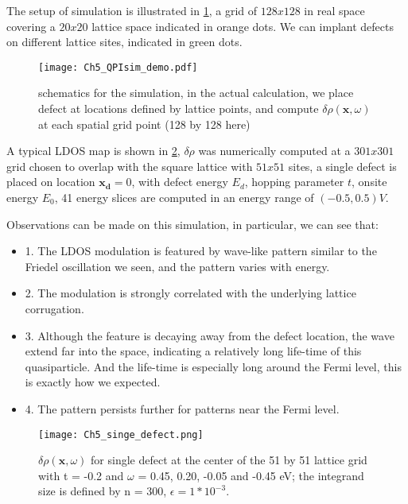 The setup of simulation is illustrated in \ref{fig:ch5_qpisim_demo}, a grid of $128x128$ in real space covering a $20x20$ lattice space indicated in orange dots. We can implant defects on different lattice sites, indicated in green dots. 

\begin{figure}
	\centering
	\texttt{[image: Ch5\_QPIsim\_demo.pdf]}
	\caption{schematics for the simulation, in the actual calculation, we place defect at locations defined by lattice points, and compute $\delta\rho(\textbf{x},\omega)$ at each spatial grid point (128 by 128 here)}
	\label{fig:ch5_qpisim_demo}
\end{figure}

A typical \ac{LDOS} map is shown in \ref{fig:ch5_single_scattering}, $\delta\rho$ was numerically computed at a $301x301$ grid chosen to overlap with the square lattice with $51x51$ sites, a single defect is placed on location $\mathbf{x_d}=0$, with defect energy $E_d$, hopping parameter $t$, onsite energy $E_0$, 41 energy slices are computed in an energy range of $(-0.5, 0.5)V$.  

Observations can be made on this simulation, in particular, we can see that:
\begin{itemize}
	\item 1. The \ac{LDOS} modulation is featured by wave-like pattern similar to the Friedel oscillation we seen, and the pattern varies with energy.
	\item 2. The modulation is strongly correlated with the underlying lattice corrugation. 
	\item 3. Although the feature is decaying away from the defect location, the wave extend far into the space, indicating a relatively long life-time of this quasiparticle. And the life-time is especially long around the Fermi level, this is exactly how we expected. 
	\item 4. The pattern persists further for patterns near the Fermi level. 
\end{itemize}


\begin{figure}
	\centering
	\texttt{[image: Ch5\_singe\_defect.png]} %
	\caption{$\delta\rho(\textbf{x},\omega)$ for single defect at the center of the 51 by 51 lattice grid with t = -0.2 and $\omega$ = 0.45, 0.20, -0.05 and -0.45 eV; the integrand size is defined by n = 300, $\epsilon = 1*10^{-3}$. }
	\label{fig:ch5_single_scattering}
\end{figure}

